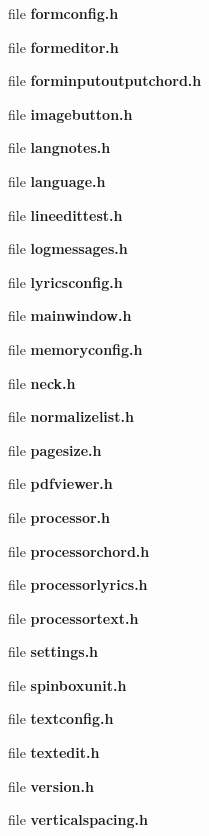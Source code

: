 \begin{DoxyCompactItemize}
file \textbf{ formconfig.\+h}
\item 
file \textbf{ formeditor.\+h}
\item 
file \textbf{ forminputoutputchord.\+h}
\item 
file \textbf{ imagebutton.\+h}
\item 
file \textbf{ langnotes.\+h}
\item 
file \textbf{ language.\+h}
\item 
file \textbf{ lineedittest.\+h}
\item 
file \textbf{ logmessages.\+h}
\item 
file \textbf{ lyricsconfig.\+h}
\item 
file \textbf{ mainwindow.\+h}
\item 
file \textbf{ memoryconfig.\+h}
\item 
file \textbf{ neck.\+h}
\item 
file \textbf{ normalizelist.\+h}
\item 
file \textbf{ pagesize.\+h}
\item 
file \textbf{ pdfviewer.\+h}
\item 
file \textbf{ processor.\+h}
\item 
file \textbf{ processorchord.\+h}
\item 
file \textbf{ processorlyrics.\+h}
\item 
file \textbf{ processortext.\+h}
\item 
file \textbf{ settings.\+h}
\item 
file \textbf{ spinboxunit.\+h}
\item 
file \textbf{ textconfig.\+h}
\item 
file \textbf{ textedit.\+h}
\item 
file \textbf{ version.\+h}
\item 
file \textbf{ verticalspacing.\+h}
\end{DoxyCompactItemize}
